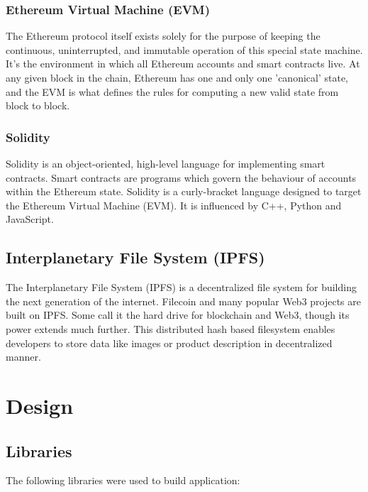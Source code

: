 \documentclass[journal]{IEEEtran} %
\begin{document}
            \subsubsection{Ethereum Virtual Machine (EVM)}
                The Ethereum protocol itself exists solely for the purpose of keeping the continuous, uninterrupted, and immutable operation of this special state machine. It's the environment in which all Ethereum accounts and smart contracts live. At any given block in the chain, Ethereum has one and only one 'canonical' state, and the EVM is what defines the rules for computing a new valid state from block to block.\\
                
            \subsubsection{Solidity}
                Solidity is an object-oriented, high-level language for implementing smart contracts. Smart contracts are programs which govern the behaviour of accounts within the Ethereum state. Solidity is a curly-bracket language designed to target the Ethereum Virtual Machine (EVM). It is influenced by C++, Python and JavaScript.\\
            
    \subsection{Interplanetary File System (IPFS)}
        The Interplanetary File System (IPFS) is a decentralized file system for building the next generation of the internet. Filecoin and many popular Web3 projects are built on IPFS. Some call it the hard drive for blockchain and Web3, though its power extends much further. This distributed hash based filesystem enables developers to store data like images or product description in decentralized manner. 

\section{Design}
    \subsection{Libraries}
        The following libraries were used to build application:\\
        
\end{document}
